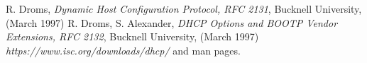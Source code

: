 \begin{thebibliography}{99}
 R. Droms, \emph{Dynamic Host Configuration Protocol, RFC 2131}, Bucknell University, (March 1997)
 R. Droms, S. Alexander, \emph{DHCP Options and BOOTP Vendor Extensions, RFC 2132}, Bucknell University,  (March 1997)
 \emph{https://www.isc.org/downloads/dhcp/} and man pages.
\end{thebibliography}